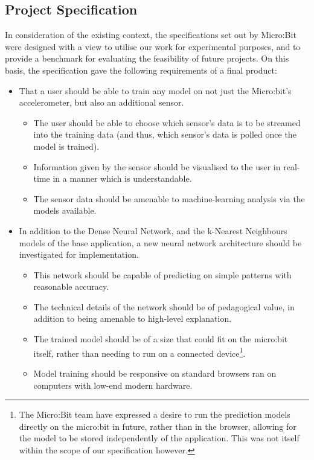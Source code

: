 \documentclass{article}
\begin{document}

\subsection{Project Specification}%
\label{subsec:spec}

In consideration of the existing context, the specifications set out by Micro:Bit were designed with a view to utilise our work for experimental purposes, and to provide a benchmark for evaluating the feasibility of future projects. On this basis, the specification gave the following requirements of a final product:
\begin{itemize}
  \item That a user should be able to train any model on not just the Micro:bit's accelerometer, but also an additional sensor.
        \begin{itemize}
                \item The user should be able to choose which sensor's data is to be streamed into the training data (and thus, which sensor's data is polled once the model is trained).
                \item Information given by the sensor should be visualised to the user in real-time in a manner which is understandable.
                \item The sensor data should be amenable to machine-learning analysis via the models available.
        \end{itemize}
  \item In addition to the Dense Neural Network, and the k-Nearest Neighbours models of the base application, a new neural network architecture should be investigated for implementation.
        \begin{itemize}
                \item This network should be capable of predicting on simple patterns with reasonable accuracy.
                \item The technical details of the network should be of pedagogical value, in addition to being amenable to high-level explanation.
                \item The trained model should be of a size that could fit on the micro:bit itself, rather than needing to run on a connected device\footnote{The Micro:Bit team have expressed a desire to run the prediction models directly on the micro:bit in future, rather than in the browser, allowing for the model to be stored independently of the application. This was not itself within the scope of our specification however.}.
                \item Model training should be responsive on standard browsers ran on computers with low-end modern hardware.
        \end{itemize}
\end{itemize}
\end{document}
